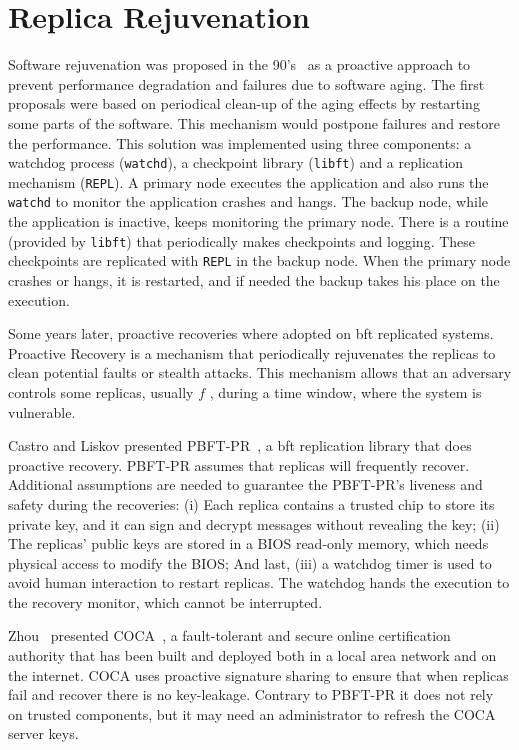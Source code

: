 \section{Replica Rejuvenation}
Software rejuvenation was proposed in the 90's~\cite{Huang:1993,Huang:1995} as a proactive approach to prevent performance degradation and failures due to software aging. 
The first proposals were based on periodical clean-up of the aging effects by restarting some parts of the software. 
This mechanism would postpone failures and restore the performance. 
This solution was implemented using three components: a watchdog process (\texttt{watchd}), a checkpoint library (\texttt{libft}) and a replication mechanism (\texttt{REPL}). 
A primary node executes the application and also runs the \texttt{watchd} to monitor the application crashes and hangs. 
The backup node, while the application is inactive, keeps monitoring the primary node. 
There is a routine (provided by \texttt{libft}) that periodically makes checkpoints and logging. 
These checkpoints are replicated with \texttt{REPL} in the backup node. 
When the primary node crashes or hangs, it is restarted, and if needed the backup takes his place on the execution.


Some years later, proactive recoveries where adopted on \gls{bft} replicated systems.
Proactive Recovery is a mechanism that periodically rejuvenates the replicas to clean potential faults or stealth attacks. 
This mechanism allows that an adversary controls some replicas, usually $f$ , during a time window, where the system is vulnerable.

Castro and Liskov presented PBFT-PR~\cite{Castro:2002}, a \gls{bft} replication library that does proactive recovery. 
\textsc{PBFT-PR} assumes that replicas will frequently recover. 
Additional assumptions are needed to guarantee the \textsc{PBFT-PR}'s liveness and safety during the recoveries: 
(i) Each replica contains a trusted chip to store its private key, and it can sign and decrypt messages without revealing the key; 
(ii) The replicas’ public keys are stored in a BIOS read-only memory, which needs physical access to modify the BIOS; 
And last, (iii) a watchdog timer is used to avoid human interaction to restart replicas. 
The watchdog hands the execution to the recovery monitor, which cannot be interrupted.


Zhou~\etal{} presented \textsc{COCA}~\cite{Zhou:2002}, a fault-tolerant and secure online certification authority that has been built and deployed both in a local area network and on the internet.
\textsc{COCA} uses proactive signature sharing to ensure that when replicas fail and recover there is no key-leakage. 
Contrary to \textsc{PBFT-PR} it does not rely on trusted components, but it may need an administrator to refresh the \textsc{COCA} server keys.


